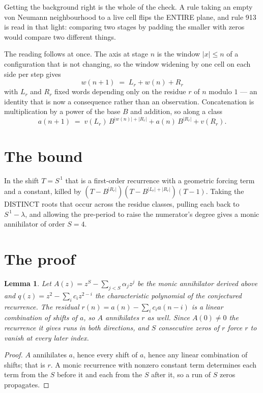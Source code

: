 \documentclass[11pt,a4paper]{article}
\theoremstyle{plain}
\newtheorem{lemma}[theorem]{Lemma}
\theoremstyle{definition}
\begin{document}
Getting the background right is the whole of the check. A rule taking an empty von Neumann
neighbourhood to a live cell flips the ENTIRE plane, and rule 913 is read
in that light: comparing two stages by padding the smaller with zeros would compare two
different things.

The reading follows at once. The axis at stage $n$ is the window $|x|\le n$ of a configuration
that is not changing, so the window widening by one cell on each side per step gives
\[
w(n+1)\;=\;L_r + w(n) + R_r
\]
with $L_r$ and $R_r$ fixed words depending only on the residue $r$ of $n$ modulo $1$ --- an
identity that is now a consequence rather than an observation. Concatenation is multiplication
by a power of the base $B$ and addition, so along a class
\[
a(n+1)\;=\;v(L_r)\,B^{|w(n)|+|R_r|} + a(n)\,B^{|R_r|} + v(R_r).
\]

\section{The bound}

In the shift $T=S^{\,1}$ that is a first-order recurrence with a geometric forcing term and a
constant, killed by $(T-B^{|R_r|})(T-B^{|L_r|+|R_r|})(T-1)$. Taking the DISTINCT roots that
occur across the residue classes, pulling each back to $S^{\,1}-\lambda$, and allowing the
pre-period to raise the numerator's degree gives a monic annihilator of order $S=4$.

\section{The proof}

\begin{lemma}\label{lem:crit}
Let $A(z)=z^S-\sum_{j<S}\alpha_jz^{j}$ be the monic annihilator derived above and
$q(z)=z^{2}-\sum_ic_iz^{2-i}$ the characteristic polynomial of the conjectured
recurrence. The residual $r(n)=a(n)-\sum_ic_ia(n-i)$ is a linear combination of shifts of $a$,
so $A$ annihilates $r$ as well. Since $A(0)\ne0$ the recurrence it gives runs in both
directions, and $S$ consecutive zeros of $r$ force $r$ to vanish at every later index.
\end{lemma}

\begin{proof}
$A$ annihilates $a$, hence every shift of $a$, hence any linear combination of shifts; that is
$r$. A monic recurrence with nonzero constant term determines each term from the $S$ before it
and each from the $S$ after it, so a run of $S$ zeros propagates.
\end{proof}
\end{document}
